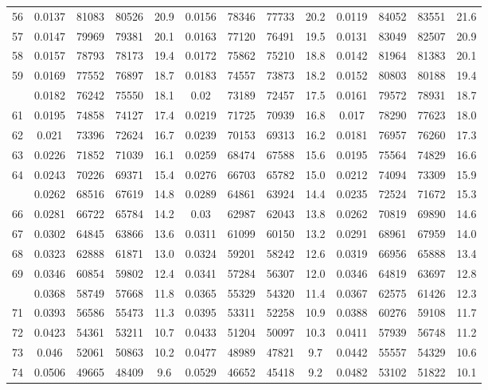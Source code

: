 \documentclass[
  14pt,
]{article}
\begin{document}
\begin{longtable}[t]{lcccccccccccc}
56 & 0.0137 & 81083 & 80526 & 20.9 & 0.0156 & 78346 & 77733 & 20.2 & 0.0119 & 84052 & 83551 & 21.6\\
57 & 0.0147 & 79969 & 79381 & 20.1 & 0.0163 & 77120 & 76491 & 19.5 & 0.0131 & 83049 & 82507 & 20.9\\
58 & 0.0157 & 78793 & 78173 & 19.4 & 0.0172 & 75862 & 75210 & 18.8 & 0.0142 & 81964 & 81383 & 20.1\\
59 & 0.0169 & 77552 & 76897 & 18.7 & 0.0183 & 74557 & 73873 & 18.2 & 0.0152 & 80803 & 80188 & 19.4\\
\addlinespace
60 & 0.0182 & 76242 & 75550 & 18.1 & 0.02 & 73189 & 72457 & 17.5 & 0.0161 & 79572 & 78931 & 18.7\\
61 & 0.0195 & 74858 & 74127 & 17.4 & 0.0219 & 71725 & 70939 & 16.8 & 0.017 & 78290 & 77623 & 18.0\\
62 & 0.021 & 73396 & 72624 & 16.7 & 0.0239 & 70153 & 69313 & 16.2 & 0.0181 & 76957 & 76260 & 17.3\\
63 & 0.0226 & 71852 & 71039 & 16.1 & 0.0259 & 68474 & 67588 & 15.6 & 0.0195 & 75564 & 74829 & 16.6\\
64 & 0.0243 & 70226 & 69371 & 15.4 & 0.0276 & 66703 & 65782 & 15.0 & 0.0212 & 74094 & 73309 & 15.9\\
\addlinespace
65 & 0.0262 & 68516 & 67619 & 14.8 & 0.0289 & 64861 & 63924 & 14.4 & 0.0235 & 72524 & 71672 & 15.3\\
66 & 0.0281 & 66722 & 65784 & 14.2 & 0.03 & 62987 & 62043 & 13.8 & 0.0262 & 70819 & 69890 & 14.6\\
67 & 0.0302 & 64845 & 63866 & 13.6 & 0.0311 & 61099 & 60150 & 13.2 & 0.0291 & 68961 & 67959 & 14.0\\
68 & 0.0323 & 62888 & 61871 & 13.0 & 0.0324 & 59201 & 58242 & 12.6 & 0.0319 & 66956 & 65888 & 13.4\\
69 & 0.0346 & 60854 & 59802 & 12.4 & 0.0341 & 57284 & 56307 & 12.0 & 0.0346 & 64819 & 63697 & 12.8\\
\addlinespace
70 & 0.0368 & 58749 & 57668 & 11.8 & 0.0365 & 55329 & 54320 & 11.4 & 0.0367 & 62575 & 61426 & 12.3\\
71 & 0.0393 & 56586 & 55473 & 11.3 & 0.0395 & 53311 & 52258 & 10.9 & 0.0388 & 60276 & 59108 & 11.7\\
72 & 0.0423 & 54361 & 53211 & 10.7 & 0.0433 & 51204 & 50097 & 10.3 & 0.0411 & 57939 & 56748 & 11.2\\
73 & 0.046 & 52061 & 50863 & 10.2 & 0.0477 & 48989 & 47821 & 9.7 & 0.0442 & 55557 & 54329 & 10.6\\
74 & 0.0506 & 49665 & 48409 & 9.6 & 0.0529 & 46652 & 45418 & 9.2 & 0.0482 & 53102 & 51822 & 10.1\\

\end{longtable}
\end{document}
